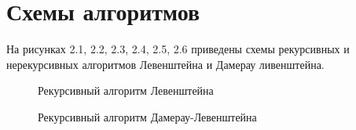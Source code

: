 \documentclass[12pt]{report}
\begin{document}
\section{Схемы алгоритмов}
На рисунках 2.1, 2.2, 2.3, 2.4, 2.5, 2.6 приведены схемы рекурсивных и нерекурсивных алгоритмов Левенштейна и Дамерау ливенштейна.
\begin{figure}[h!]
\caption{Рекурсивный алгоритм Левенштейна}
\end{figure}
\begin{figure}[h!]
\caption{Рекурсивный алгоритм Дамерау-Левенштейна}
\end{figure}
\end{document}
